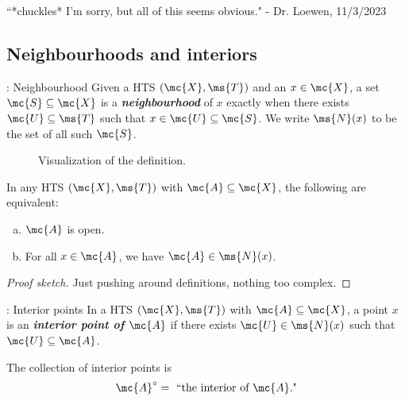 \clearpage
\begin{nquote}{}
	``*chuckles* I'm sorry, but all of this seems obvious." - Dr. Loewen, 11/3/2023
\end{nquote}

\subsection{Neighbourhoods and interiors}
\begin{ndef}{: Neighbourhood}
	Given a HTS  \((\mc{X},\ms{T})\) and an \(x\in\mc{X}\), a set \(\mc{S}\subseteq\mc{X}\) is a \emph{\textbf{neighbourhood}} of \(x\) exactly when there exists \(\mc{U}\subseteq\ms{T}\) such that \(x\in\mc{U}\subseteq\mc{S}\). We write \(\ms{N}(x)\) to be the set of all such \(\mc{S}\).
\end{ndef}
\begin{figure}[htbp]
	\centering
	\caption{Visualization of the definition.}
\end{figure}
\begin{nlemma}{}
	In any HTS \((\mc{X},\ms{T})\) with \(\mc{A}\subseteq\mc{X}\), the following are equivalent:
	\begin{enumerate}[(a)]
		\item \(\mc{A}\) is open.
		
		
		\item For all \(x\in\mc{A}\), we have \(\mc{A}\in\ms{N}(x)\).
	\end{enumerate}
\end{nlemma}
\begin{proof}[Proof sketch]
	Just pushing around definitions, nothing too complex.
\end{proof}
\begin{ndef}{: Interior points}
	In a HTS \((\mc{X},\ms{T})\) with \(\mc{A}\subseteq\mc{X}\), a point \(x\) is an \emph{\textbf{interior point of \(\mc{A}\)}} if there exists \(\mc{U}\in\ms{N}(x)\) such that \(\mc{U}\subseteq\mc{A}\).
	
	\medskip
	
	The collection of interior points is
	\begin{equation*}
		\mc{A}^{\circ}=~\text{``the interior of \(\mc{A}\)."}
	\end{equation*}
\end{ndef}
